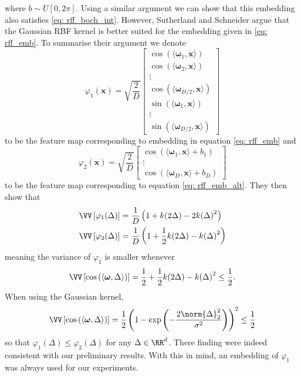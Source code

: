 where $b \sim U \left[ 0,2 \pi \right]$. Using a similar argument we can show that this embedding also satisfies \ref{eq: rff_boch_int}. However, Sutherland and Schneider \cite{sutherland2015error} argue that the Gaussian RBF kernel is better suited for the embedding given in \ref{eq: rff_emb}. To summarise their argument we denote
\begin{equation} \label{eq: rff_feat_map_1}
    \varphi_1 (\bm{x}) = \sqrt{\frac{2}{D}}
    \begin{bmatrix}
        \cos \left( \langle \bm{\omega}_{1} , \bm{x} \rangle \right)   \\
        \cos \left( \langle \bm{\omega}_{2} , \bm{x} \rangle \right)   \\
        \vdots                                                         \\
        \cos \left( \langle \bm{\omega}_{D/2} , \bm{x} \rangle \right) \\
        \sin \left( \langle \bm{\omega}_{1} , \bm{x} \rangle \right)   \\
        \vdots                                                         \\
        \sin \left( \langle \bm{\omega}_{D/2} , \bm{x} \rangle \right)
    \end{bmatrix}
\end{equation}
to be the feature map corresponding to embedding in equation \ref{eq: rff_emb} and
\begin{equation} \label{eq: rff_feat_map_2}
    \varphi_2 (\bm{x}) = \sqrt{\frac{2}{D}}
    \begin{bmatrix}
        \cos \left( \langle \bm{\omega}_{1} , \bm{x} \rangle + b_1 \right) \\
        \vdots                                                             \\
        \cos \left( \langle \bm{\omega}_{D} , \bm{x} \rangle + b_D \right)
    \end{bmatrix}
\end{equation}
to be the feature map corresponding to equation \ref{eq: rff_emb_alt}. They then show that
\begin{align*}
    \VV \left[ \varphi_1 (\Delta) \right] & = \frac{1}{D} \left( 1 + k (2 \Delta) - 2 {k( \Delta)}^2 \right)           \\
    \VV \left[ \varphi_2 (\Delta) \right] & = \frac{1}{D} \left( 1 + \frac{1}{2} k (2 \Delta) - {k( \Delta)}^2 \right)
\end{align*}
meaning the variance of $\varphi_1$ is smaller whenever
\[
    \VV \left[ \cos \left( \langle \bm{\omega} , \Delta \rangle \right) \right] = \frac{1}{2} + \frac{1}{2} k (2 \Delta) - {k( \Delta)}^2 \leq \frac{1}{2} .
\]
When using the Gaussian kernel,
\[
    \VV \left[ \cos \left( \langle \bm{\omega} , \Delta \rangle \right) \right] = \frac{1}{2} \left( 1 - \exp \left( - \frac{2\norm{\Delta}^2_2}{\sigma^2} \right) \right)^2 \leq \frac{1}{2}
\]
so that $\varphi_1 (\Delta) \leq \varphi_2 (\Delta)$ for any $\Delta \in \RR^d$. There finding were indeed consistent with our preliminary results. With this in mind, an embedding of $\varphi_1$ was always used for our experiments.

